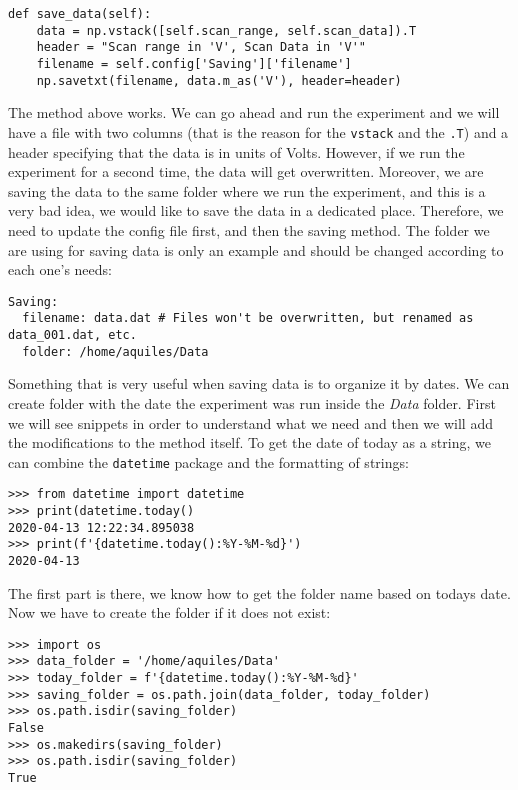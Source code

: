{{{{\begin{verbatim}
def save_data(self):
	data = np.vstack([self.scan_range, self.scan_data]).T
    header = "Scan range in 'V', Scan Data in 'V'"
    filename = self.config['Saving']['filename']  
    np.savetxt(filename, data.m_as('V'), header=header)
\end{verbatim}

The method above works. We can go ahead and run the experiment and we will have a file with two columns (that is the reason for the \texttt{vstack} and the \texttt{.T}) and a header specifying that the data is in units of Volts. However, if we run the experiment for a second time, the data will get overwritten. Moreover, we are saving the data to the same folder where we run the experiment, and this is a very bad idea, we would like to save the data in a dedicated place. Therefore, we need to update the config file first, and then the saving method. The folder we are using for saving data is only an example and should be changed according to each one's needs:

\begin{verbatim}
Saving:
  filename: data.dat # Files won't be overwritten, but renamed as data_001.dat, etc.
  folder: /home/aquiles/Data 
\end{verbatim}

Something that is very useful when saving data is to organize it by dates. We can create folder with the date the experiment was run inside the \emph{Data} folder. First we will see snippets in order to understand what we need and then we will add the modifications to the method itself. To get the date of today as a string, we can combine the \texttt{datetime} package and the formatting of strings:

\begin{verbatim}
>>> from datetime import datetime
>>> print(datetime.today()
2020-04-13 12:22:34.895038
>>> print(f'{datetime.today():%Y-%M-%d}')
2020-04-13
\end{verbatim}

The first part is there, we know how to get the folder name based on todays date. Now we have to create the folder if it does not exist:

\begin{verbatim}
>>> import os
>>> data_folder = '/home/aquiles/Data'
>>> today_folder = f'{datetime.today():%Y-%M-%d}'
>>> saving_folder = os.path.join(data_folder, today_folder)
>>> os.path.isdir(saving_folder)
False
>>> os.makedirs(saving_folder)
>>> os.path.isdir(saving_folder)
True
\end{verbatim}

}}}}
